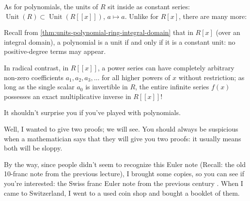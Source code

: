 \begin{content}
As for polynomials, the units of $R$ sit inside as constant series: $\operatorname{Unit}(R) \subset \operatorname{Unit}(R[[x]])$, $a \mapsto a$. Unlike for $R[x]$, there are many more:


\begin{steps}
Recall from \cref{thm:units-polynomial-ring-integral-domain} that in $R[x]$ (over an integral domain), a polynomial is a unit if and only if it is a constant unit: no positive-degree terms may appear. 

In radical contrast, in $R[[x]]$, a power series can have completely arbitrary non-zero coefficients $a_1, a_2, a_3, \dots$ for all higher powers of $x$ without restriction; as long as the single scalar $a_0$ is invertible in $R$, the entire infinite series $f(x)$ possesses an exact multiplicative inverse in $R[[x]]$!
\end{steps}
\end{content}

\begin{speech}[00:36:51 - 00:37:45]
It shouldn't surprise you if you've played with polynomials.

Well, I wanted to give two proofs; we will see. You should always be suspicious when a mathematician says that they will give you two proofs: it usually means both will be sloppy. 

By the way, since people didn't seem to recognize this Euler note (Recall: the old 10-franc note from the previous lecture), I brought some copies, so you can see if you're interested: the Swiss franc Euler note from the previous century . When I came to Switzerland, I went to a used coin shop and bought a booklet of them.
\end{speech}

